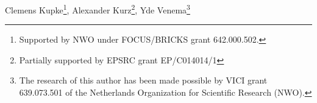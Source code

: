 \documentclass{book}
\begin{document}
{Clemens Kupke\thanks{Supported by NWO under FOCUS/BRICKS grant 642.000.502.},
Alexander Kurz\thanks{Partially supported by EPSRC grant EP/C014014/1 }, 
Yde Venema\thanks{The research of this author has been made possible by 
    VICI grant 639.073.501 of the Netherlands Organization for Scientific
    Research (NWO).}}


\newcommand{\xxviom}{\omega}

\newcommand{\xxviSet}{\mathsf{Set}}
\newcommand{\xxviBA}{\mathsf{BA}}

\newcommand{\xxviId}{\mathit{Id}}
\newcommand{\xxviF}{T}
\newcommand{\xxviFom}{\xxviF_{\omega}}
\newcommand{\xxviPw}{\mathcal{P}} %
\newcommand{\xxviPc}{P} %
\newcommand{\xxviPom}{\xxviPw_{\omega}}
\newcommand{\xxviMoss}{M}
\newcommand{\xxviFree}{\mathbb{F}}
\newcommand{\xxviFalg}{\mathbb{L}_0}

\newcommand{\xxviPal}{\mathbb{P}}
\newcommand{\xxviLbb}{{\mathbb{L}}} %
\newcommand{\xxviM}{\mathbb{M}}

\newcommand{\xxviol}[1]{\overline{#1}}
\newcommand{\xxviid}{{\mathrm{id}}}


\newcommand{\xxviLang}{\mathcal{L}}
\newcommand{\xxviLcal}{\mathcal{L}}
\newcommand{\xxviBase}{\mathit{Base}}
\newcommand{\xxvinb}{\nabla}
\newcommand{\xxvibw}{\bigwedge}
\newcommand{\xxvibv}{\bigvee}

\newcommand{\xxviSRD}{\mathit{SRD}}

\newcommand{\xxviis}{\approx}
\newcommand{\xxviissm}{\preceq}

\newcommand{\xxviD}{\mathcal{D}}
\newcommand{\xxvinax}{\mathbf{M}}

\newcommand{\xxvibbS}{\mathbb{S}}

\newcommand{\xxviLTn}{\xxviLang_{n}/{\equiv}}
\newcommand{\xxviLTM}{\mathcal{M}}
\newcommand{\xxvibbA}{\mathbb{A}}
\newcommand{\xxvibbB}{\mathbb{B}}
\newcommand{\xxvibbtwo}{\mathbbm{2}}

\newcommand{\xxvibap}[2]{\mathrm{BA}\langle #1, #2 \rangle}

\newcommand{\xxvilsem}{\mathopen{[\![}}
\newcommand{\xxvirsem}{\mathclose{]\!]}}
\newcommand{\xxvisem}[1]{\xxvilsem #1 \xxvirsem}
\newcommand{\xxvirst}[1]{\!\upharpoonright_{#1}\,}
\newcommand{\xxviterm}{\mathsf{T}_\xxviBA}
\newcommand{\xxviquo}{\mathfrak{q}}
\newcommand{\xxvicoloneqq}{\mathrel{:=}}
\newcommand{\xxviGraph}{\mathrm{Gr}}
\newcommand{\xxviconv}[1]{#1\breve{\hspace*{1mm}}}
\end{document}
